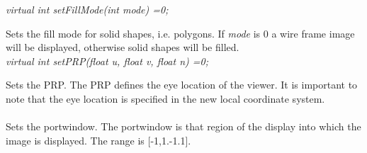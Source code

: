 {\em    virtual int setFillMode(int mode) =0;}

Sets the fill mode for solid shapes, i.e. polygons. If {\em mode} is
$0$ a wire frame image will be displayed, otherwise solid shapes will
be filled. \\

{\em    virtual int setPRP(float u, float v, float n) =0;}

Sets the PRP. The PRP defines the eye location of the viewer. It is
important to note that the eye location is specified in the new local
coordinate system. \\

\\ 
Sets the portwindow. The portwindow is that region of the display
into which the image is displayed. The range is [-1,1.-1.1]. \\